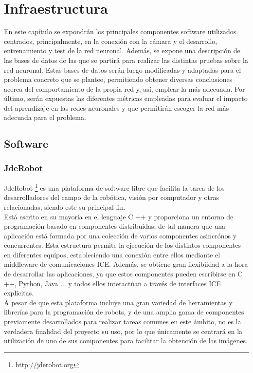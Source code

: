 \chapter{Infraestructura}\label{cap.infraestructura}
En este capítulo se expondrán los principales componentes software utilizados, centrados, principalmente, en la conexión con la cámara y el desarrollo, entrenamiento y test de la red neuronal. Además, se expone una descripción de las bases de datos de las que se partirá para realizar las distintas pruebas sobre la red neuronal. Estas bases de datos serán luego modificadas y adaptadas para el problema concreto que se plantee, permitiendo obtener diversas conclusiones acerca del comportamiento de la propia red y, así, emplear la más adecuada. Por último, serán expuestas las diferentes métricas empleadas para evaluar el impacto del aprendizaje en las redes neuronales y que permitirán escoger la red más adecuada para el problema.\\
\section{Software}
\subsection{JdeRobot}\label{sec.jderobot}
JdeRobot \footnote{http://jderobot.org} es una plataforma de software libre que facilita la tarea de los desarrolladores del campo de la robótica, visión por computador y otras relacionadas, siendo este su principal fin.\\ 

Está escrito en su mayoría en el lenguaje C ++ y proporciona un entorno de programación basado en componentes distribuidas, de tal manera que una aplicación está formada por una colección de varios componentes asincrónos y concurrentes. Esta estructura permite la ejecución de los distintos componentes en diferentes equipos, estableciendo una conexión entre ellos mediante el middleware de comunicaciones ICE. Además, se obtiene gran flexibiidad a la hora de desarrollar las aplicaciones, ya que estos componentes pueden escribirse en C ++, Python, Java ... y todos ellos interactúan a través de interfaces ICE explícitas.\\ 

A pesar de que esta plataforma incluye una gran variedad de herramientas y librerías para la programación de robots, y de una amplia gama de componentes previamente desarrollados para realizar tareas comunes en este ámbito, no es la verdadera finalidad del proyecto su uso, por lo que únicamente se centrará en la utilización de uno de sus componentes para facilitar la obtención de las imágenes.\\

